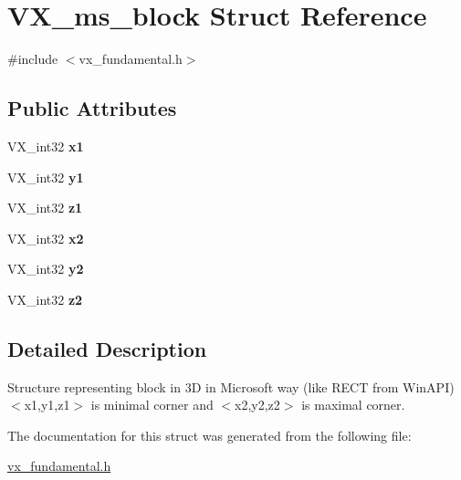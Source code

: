 \hypertarget{structVX__ms__block}{\section{V\-X\-\_\-ms\-\_\-block Struct Reference}
\label{structVX__ms__block}
}


{\ttfamily \#include $<$vx\-\_\-fundamental.\-h$>$}

\subsection*{Public Attributes}
\begin{DoxyCompactItemize}
\item 
\hypertarget{structVX__ms__block_a8015f3702129addde7710825c120b930}{V\-X\-\_\-int32 {\bfseries x1}}\label{structVX__ms__block_a8015f3702129addde7710825c120b930}

\item 
\hypertarget{structVX__ms__block_ac1ec8c6dce8a177f4afa89b557bf0538}{V\-X\-\_\-int32 {\bfseries y1}}\label{structVX__ms__block_ac1ec8c6dce8a177f4afa89b557bf0538}

\item 
\hypertarget{structVX__ms__block_a3f1e634521331cf9cc5c08c12bef6f50}{V\-X\-\_\-int32 {\bfseries z1}}\label{structVX__ms__block_a3f1e634521331cf9cc5c08c12bef6f50}

\item 
\hypertarget{structVX__ms__block_a9e70d8174e93aa2b46c649a66baaa1d3}{V\-X\-\_\-int32 {\bfseries x2}}\label{structVX__ms__block_a9e70d8174e93aa2b46c649a66baaa1d3}

\item 
\hypertarget{structVX__ms__block_a6f4bfa49cb24f6e90e86e36fff9caae2}{V\-X\-\_\-int32 {\bfseries y2}}\label{structVX__ms__block_a6f4bfa49cb24f6e90e86e36fff9caae2}

\item 
\hypertarget{structVX__ms__block_a5cc1d83771e577a5d0f9f9201dc5c815}{V\-X\-\_\-int32 {\bfseries z2}}\label{structVX__ms__block_a5cc1d83771e577a5d0f9f9201dc5c815}

\end{DoxyCompactItemize}


\subsection{Detailed Description}
Structure representing block in 3\-D in Microsoft way (like R\-E\-C\-T from Win\-A\-P\-I) $<$x1,y1,z1$>$ is minimal corner and $<$x2,y2,z2$>$ is maximal corner. 

The documentation for this struct was generated from the following file\-:\begin{DoxyCompactItemize}
\item 
\hyperlink{vx__fundamental_8h}{vx\-\_\-fundamental.\-h}\end{DoxyCompactItemize}

